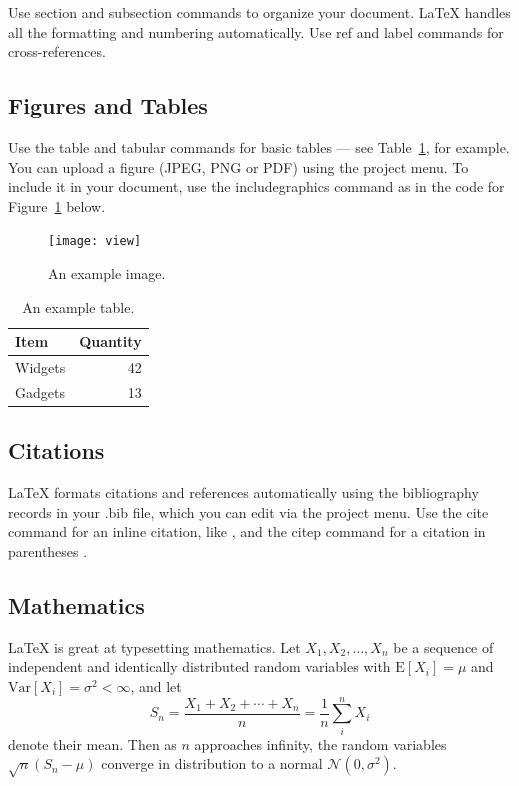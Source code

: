 \documentclass[fleqn,10pt]{wlpeerj} %
\begin{document}
Use section and subsection commands to organize your document. \LaTeX{} handles all the formatting and numbering automatically. Use ref and label commands for cross-references.

\subsection*{Figures and Tables}

Use the table and tabular commands for basic tables --- see Table~\ref{tab:widgets}, for example. You can upload a figure (JPEG, PNG or PDF) using the project menu. To include it in your document, use the includegraphics command as in the code for Figure~\ref{fig:view} below.

\begin{figure}[ht]
\centering
\texttt{[image: view]}
\caption{An example image.}
\label{fig:view}
\end{figure}

\begin{table}[ht]
\centering
\begin{tabular}{l|r}
Item & Quantity \\\hline
Widgets & 42 \\
Gadgets & 13
\end{tabular}
\caption{\label{tab:widgets}An example table.}
\end{table}

\subsection*{Citations}

LaTeX formats citations and references automatically using the bibliography records in your .bib file, which you can edit via the project menu. Use the cite command for an inline citation, like \cite{Figueredo:2009dg}, and the citep command for a citation in parentheses \citep{Figueredo:2009dg}.

\subsection*{Mathematics}

\LaTeX{} is great at typesetting mathematics. Let $X_1, X_2, \ldots, X_n$ be a sequence of independent and identically distributed random variables with $\text{E}[X_i] = \mu$ and $\text{Var}[X_i] = \sigma^2 < \infty$, and let
$$S_n = \frac{X_1 + X_2 + \cdots + X_n}{n}
      = \frac{1}{n}\sum_{i}^{n} X_i$$
denote their mean. Then as $n$ approaches infinity, the random variables $\sqrt{n}(S_n - \mu)$ converge in distribution to a normal $\mathcal{N}(0, \sigma^2)$.
\end{document}
